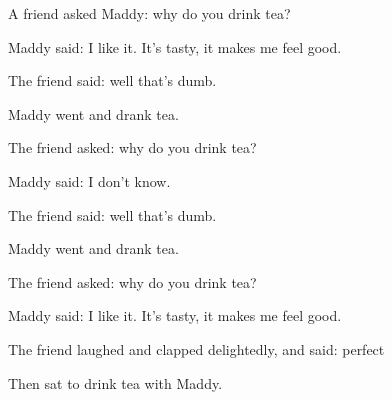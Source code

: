 A friend asked Maddy: why do you drink tea?

Maddy said: I like it. It's tasty, it makes me feel good.

The friend said: well that's dumb.

Maddy went and drank tea.

The friend asked: why do you drink tea?

Maddy said: I don't know.

The friend said: well that's dumb.

Maddy went and drank tea.

The friend asked: why do you drink tea?

Maddy said: I like it. It's tasty, it makes me feel good.

The friend laughed and clapped delightedly, and said: perfect

Then sat to drink tea with Maddy.
